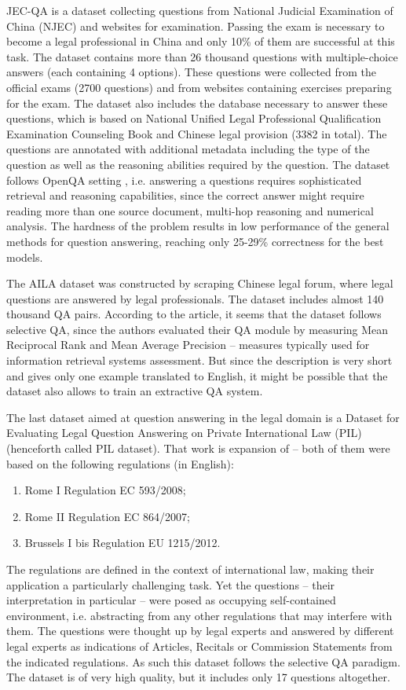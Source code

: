 JEC-QA \cite{zhong2019jecqa} is a dataset collecting questions from National Judicial Examination of China (NJEC) and websites for examination. Passing the exam is necessary to become a legal professional in China and only 10\% of them are successful at this task. The dataset contains more than 26 thousand questions with multiple-choice answers (each containing 4 options). These questions were collected from the official exams (2700 questions) and from websites containing exercises
preparing for the exam. The dataset also includes the database necessary to answer these questions, which is based on National Unified Legal Professional Qualification Examination Counseling Book and Chinese legal provision (3382 in total). The questions are annotated with additional metadata including the type of the question as well as the reasoning abilities required by the question.
The dataset follows OpenQA setting \cite{chen2017reading}, i.e. answering a questions requires sophisticated retrieval and reasoning capabilities, since the correct answer might require reading more than one source document, multi-hop reasoning and numerical analysis. The hardness of the problem results in low performance of the general methods for question answering, reaching only 25-29\% correctness for the best models.

The AILA dataset \cite{weiyi2020aila} was constructed by scraping Chinese legal forum, where legal questions are answered by legal professionals. The dataset includes almost 140 thousand QA pairs. According to the article, it seems that the dataset follows selective QA, since the authors evaluated their QA module by measuring Mean Reciprocal Rank and Mean Average Precision -- measures typically used for information retrieval systems assessment. But since the description is very short and gives only one example translated to English, it might be possible that the dataset also allows to train an
extractive QA system.

The last dataset aimed at question answering in the legal domain is a Dataset for Evaluating Legal Question Answering on Private International Law (PIL) \cite{sovrano2021dataset} (henceforth called PIL dataset). That work is expansion of \cite{sovrano2020legal} -- both of them were based on the following regulations (in English): 
\begin{enumerate}
  \item Rome I Regulation EC 593/2008;
  \item  Rome II Regulation EC 864/2007;
  \item Brussels I bis Regulation EU 1215/2012.
\end{enumerate}
The regulations are defined in the context of international law, making their application a particularly challenging task. Yet the questions -- their interpretation in particular -- were posed as occupying self-contained environment, i.e. abstracting from any other regulations that may interfere with them. The questions were thought up by legal experts and answered by different legal experts as indications of Articles, Recitals or Commission Statements from the indicated
regulations. As such this dataset follows the selective QA paradigm. The dataset is of very high quality, but it includes only 17 questions altogether.